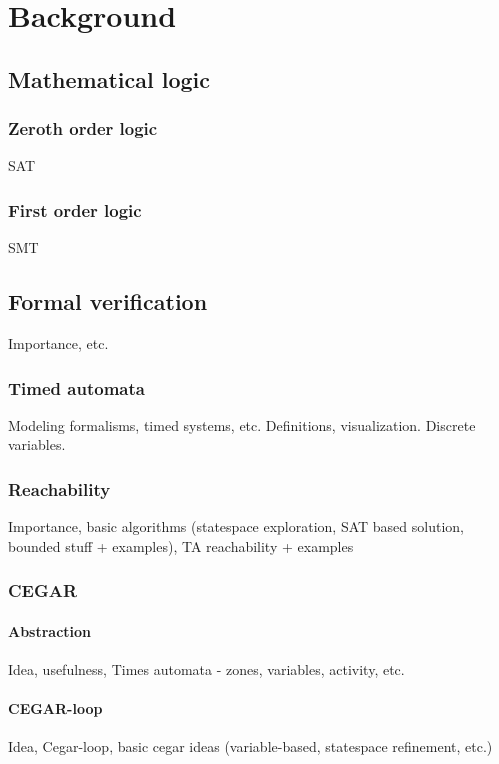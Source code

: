 \chapter{Background}
\label{chap:background}



\section{Mathematical logic}

\subsection{Zeroth order logic}
SAT
\subsection{First order logic}
SMT

\section{Formal verification}
Importance, etc.
\subsection{Timed automata}
Modeling formalisms, timed systems, etc.
Definitions, visualization.
Discrete variables.
\subsection{Reachability}
Importance, basic algorithms (statespace exploration, SAT based solution, bounded stuff + examples), TA reachability + examples
\subsection{CEGAR}
\subsubsection{Abstraction}
Idea, usefulness, Times automata - zones, variables, activity, etc.
\subsubsection{CEGAR-loop}
Idea, Cegar-loop, basic cegar ideas (variable-based, statespace refinement, etc.)


